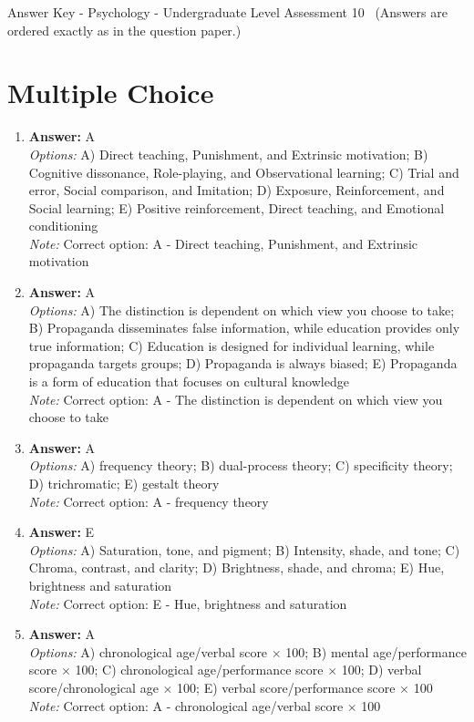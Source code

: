 \documentclass[12pt]{article}
\begin{document}
\begin{center}
Answer Key - Psychology - Undergraduate Level Assessment 10 \
\small (Answers are ordered exactly as in the question paper.)
\end{center}

\section*{Multiple Choice}
\begin{enumerate}[label=\arabic*.]
\item \textbf{Answer:} A
\\ \textit{Options:} A) Direct teaching, Punishment, and Extrinsic motivation; B) Cognitive dissonance, Role-playing, and Observational learning; C) Trial and error, Social comparison, and Imitation; D) Exposure, Reinforcement, and Social learning; E) Positive reinforcement, Direct teaching, and Emotional conditioning
\\ \textit{Note:} Correct option: A - Direct teaching, Punishment, and Extrinsic motivation
\item \textbf{Answer:} A
\\ \textit{Options:} A) The distinction is dependent on which view you choose to take; B) Propaganda disseminates false information, while education provides only true information; C) Education is designed for individual learning, while propaganda targets groups; D) Propaganda is always biased; E) Propaganda is a form of education that focuses on cultural knowledge
\\ \textit{Note:} Correct option: A - The distinction is dependent on which view you choose to take
\item \textbf{Answer:} A
\\ \textit{Options:} A) frequency theory; B) dual-process theory; C) specificity theory; D) trichromatic; E) gestalt theory
\\ \textit{Note:} Correct option: A - frequency theory
\item \textbf{Answer:} E
\\ \textit{Options:} A) Saturation, tone, and pigment; B) Intensity, shade, and tone; C) Chroma, contrast, and clarity; D) Brightness, shade, and chroma; E) Hue, brightness and saturation
\\ \textit{Note:} Correct option: E - Hue, brightness and saturation
\item \textbf{Answer:} A
\\ \textit{Options:} A) chronological age/verbal score \ensuremath{\times} 100; B) mental age/performance score \ensuremath{\times} 100; C) chronological age/performance score \ensuremath{\times} 100; D) verbal score/chronological age \ensuremath{\times} 100; E) verbal score/performance score \ensuremath{\times} 100
\\ \textit{Note:} Correct option: A - chronological age/verbal score \ensuremath{\times} 100
\end{enumerate}
\end{document}
